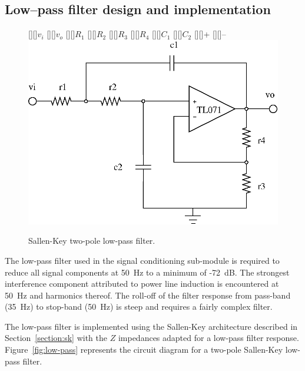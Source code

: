 \subsection{Low--pass filter design and implementation}
\begin{figure}[htbp]
	[][]{$v_i$} 
	[][]{$v_o$}
	[][]{$R_1$} 
	[][]{$R_2$}
	[][]{$R_3$} 
	[][]{$R_4$} 
	[][]{$C_1$}
	[][]{$C_2$} 
	\psfrag{+}[][]{+} 
	\psfrag{-}[][]{--} 
	\includegraphics{low-pass.eps} 
	\caption{Sallen-Key two-pole low-pass filter.}  
	\label{fig:low-pass}
\end{figure}

The low-pass filter used in the signal conditioning sub-module is
required to reduce all signal components at 50~Hz to a minimum of
-72~dB. The strongest interference component attributed to power line
induction is encountered at 50~Hz and harmonics thereof. The roll-off
of the filter response from pass-band (35~Hz) to stop-band (50~Hz) is
steep and requires a fairly complex filter.

The low-pass filter is implemented using the Sallen-Key architecture
described in Section~\vref{section:sk} with the $Z$ impedances adapted
for a low-pass filter response. Figure~\vref{fig:low-pass} represents
the circuit diagram for a two-pole Sallen-Key low-pass filter.

